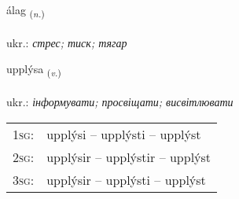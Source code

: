 \documentclass[frontgrid, backgrid]{flacards}\usepackage[]{graphicx}\usepackage[]{xcolor}
\begin{document}
{álag \small{\textsubscript{(\textit{n.})}} \\[1ex] %
\textphonetic{[auːlaɣ]} \\
ukr.: \emph{стрес; тиск; тягар} \\  [2ex]
\renewcommand*{\arraystretch}{0.8}
}

\renewcommand{\flhead}{\vskip5pt \fboxsep=0pt {\small\bfseries\footnotesize Sagnorð | дієслово}}
\renewcommand{\fcfoot}{\vskip5pt \fboxsep=0pt \hspace{2pt}{\small\bfseries\footnotesize 2K}}

\renewcommand{\blhead}{\vskip5pt {\small\bfseries\footnotesize Sagnorð | дієслово }}
\renewcommand{\bcfoot}{\vskip5pt \hspace{2pt}{\small\bfseries\footnotesize 2K}}


{upplýsa \small{\textsubscript{(\textit{v.})}} \\[1ex] %
\textphonetic{[ʏhplisa]} \\
ukr.: \emph{інформувати; просвіщати; висвітлювати} \\  [2ex]
\renewcommand*{\arraystretch}{0.8}
\begin{tabular}{p{1cm}l}
\textsc{1sg}: & upplýsi -- upplýsti -- upplýst \\ 
\textsc{2sg}: & upplýsir -- upplýstir -- upplýst \\ 
\textsc{3sg}: & upplýsir -- upplýsti -- upplýst \\ 
\end{tabular}
}

\renewcommand{\flhead}{\vskip5pt \fboxsep=0pt {\small\bfseries\footnotesize Nafnorð | іменник}}
\renewcommand{\fcfoot}{\vskip5pt \fboxsep=0pt \hspace{2pt}{\small\bfseries\footnotesize 2K}}
\end{document}
